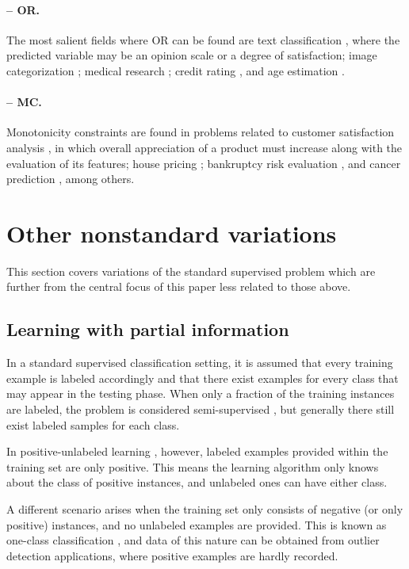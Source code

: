 \paragraph{-- OR.} The most salient fields where OR can be found are text classification \cite{aor-text}, where the predicted variable may be an opinion scale or a degree of satisfaction; image categorization \cite{aor-image}; medical research \cite{aor-medical}; credit rating \cite{aor-credit}, and age estimation \cite{aor-age}.

\paragraph{-- MC.} Monotonicity constraints are found in problems related to customer satisfaction analysis \cite{amc-customer}, in which overall appreciation of a product must increase along with the evaluation of its features; house pricing \cite{mc-trees}; bankruptcy risk evaluation \cite{amc-bank}, and cancer prediction \cite{amc-cancer}, among others.

\section{Other nonstandard variations}
\label{p3sec:othervariations}

This section covers variations of the standard supervised problem which are further from the central focus of this paper less related to those above. 

\subsection{Learning with partial information}
\label{p3sec:partial}


In a standard supervised classification setting, it is assumed that every training example is labeled accordingly and that there exist examples for every class that may appear in the testing phase. When only a fraction of the training instances are labeled, the problem is considered semi-supervised \cite{semi-sup}, but generally there still exist labeled samples for each class.

In positive-unlabeled learning \cite{pu-learn,pu-text}, however, labeled examples provided within the training set are only positive. This means the learning algorithm only knows about the class of positive instances, and unlabeled ones can have either class. 

A different scenario arises when the training set only consists of negative (or only positive) instances, and no unlabeled examples are provided. This is known as one-class classification \cite{oneclass}, and data of this nature can be obtained from outlier detection applications, where positive examples are hardly recorded.

